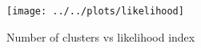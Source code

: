 \documentclass[a4paper]{article} %
\begin{document}
\begin{figure}
	\label{likelihood}
	\texttt{[image: ../../plots/likelihood]}
	\caption{Number of clusters vs likelihood index}
\end{figure}


\printbibliography

\end{document}
